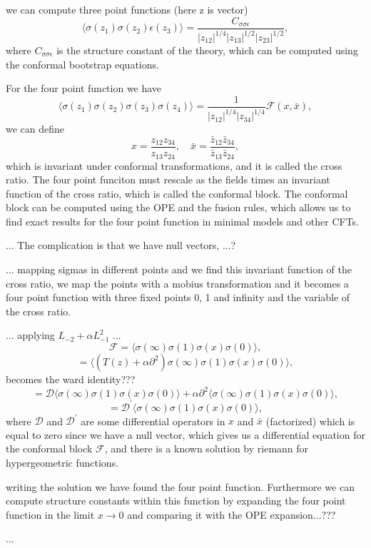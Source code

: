 we can compute three point functions (here z is vector)
\[
    \langle \sigma(z_1) \sigma(z_2) \epsilon(z_3) \rangle = \frac{C_{\sigma \sigma \epsilon}}{|z_{12}|^{1/4} |z_{13}|^{1/2} |z_{23}|^{1/2}},
\]
where \(C_{\sigma \sigma \epsilon}\) is the structure constant of the theory, which can be computed using the conformal bootstrap equations.

For the four point function we have
\[
    \langle \sigma(z_1) \sigma(z_2) \sigma(z_3) \sigma(z_4) \rangle = \frac{1}{|z_{12}|^{1/4} |z_{34}|^{1/4}} \mathcal{F}(x, \bar{x}),
\]
we can define
\[
    x = \frac{z_{12} z_{34}}{z_{13} z_{24}}, \quad \bar{x} = \frac{\bar{z}_{12} \bar{z}_{34}}{\bar{z}_{13} \bar{z}_{24}},
\]
which is invariant under conformal transformations, and it is called the cross ratio. The four point funciton must rescale as the fields times an invariant function of the cross ratio, which is called the conformal block. The conformal block can be computed using the OPE and the fusion rules, which allows us to find exact results for the four point function in minimal models and other CFTs.

... The complication is that we have null vectors, ...?

... mapping sigmas in different points and we find this invariant function of the cross ratio, we map the points with a mobius transformation and it becomes a four point function with three fixed points 0, 1 and infinity and the variable of the cross ratio.

... applying \(L_{-2} + \alpha L_{-1}^2\) ...
\[
    \mathcal{F} = \langle \sigma(\infty) \sigma(1) \sigma(x) \sigma(0) \rangle,
\]
\[
    = \langle (T(z) + \alpha \partial^2) \sigma(\infty) \sigma(1) \sigma(x) \sigma(0) \rangle,
\]
becomes the ward identity???
\[
    = \mathcal{D} \langle \sigma(\infty) \sigma(1) \sigma(x) \sigma(0) \rangle + \alpha \partial^2 \langle \sigma(\infty) \sigma(1) \sigma(x) \sigma(0) \rangle,
\]
\[
    = \mathcal{D}^{\prime} \langle \sigma(\infty) \sigma(1) \sigma(x) \sigma(0) \rangle,
\]
where \(\mathcal{D}\) and \(\mathcal{D}^{\prime}\) are some differential operators in \(x\) and \(\bar{x}\) (factorized) which is equal to zero since we have a null vector, which gives us a differential equation for the conformal block \(\mathcal{F}\), and there is a known solution by riemann for hypergeometric functions.

writing the solution we have found the four point function. Furthermore we can compute structure constants within this function by expanding the four point function in the limit \(x \to 0\) and comparing it with the OPE expansion...???

...
